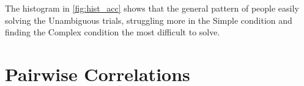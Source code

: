 The histogram in \autoref{fig:hist_acc} shows that the general pattern of people easily solving the Unambiguous trials, struggling more in the Simple condition and finding the Complex condition the most difficult to solve.

\begin{figure}
\centering
\begin{floatrow}
\end{floatrow}
\end{figure}












\section{Pairwise Correlations}
\label{sec:pairwise_corr}

